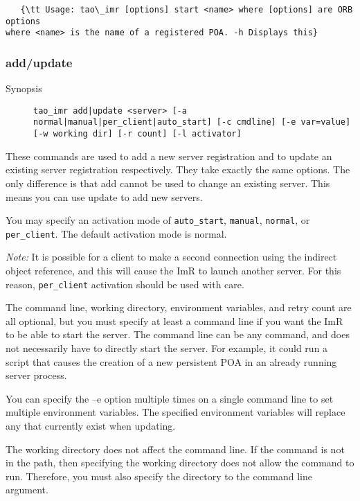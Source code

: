 \begin{itemize}
{\begin{itemize}
{{\begin{verbatim}
   {\tt Usage: tao\_imr [options] start <name> where [options] are ORB options 
where <name> is the name of a registered POA. -h Displays this}
\end{verbatim}

\subsubsection{add/update}

\begin{description}
    \item [Synopsis] {\tt tao\_imr add|update <server> 
                 [-a normal|manual|per_client|auto_start] [-c cmdline] 
                 [-e var=value] [-w working dir] [-r count] [-l activator]}
\end{description}

These commands are used to add a new server registration and to update 
an existing server registration respectively. They take exactly the same 
options. The only difference is that add cannot be used to change an 
existing server. This means you can use update to add new servers.
 
You may specify an activation mode of {\tt auto_start}, {\tt manual}, 
{\tt normal},  or {\tt per_client}. The default activation mode is normal.
 
\emph {Note:} It is possible for a client to make a second connection 
using the indirect object reference, and this will cause the ImR to launch 
another server. For this reason, {\tt per_client} activation should be used 
with care.

The command line, working directory, environment variables, and retry 
count are all optional, but you must specify at least a command line if 
you want the ImR to be able to start the server. The command line can 
be any command, and does not necessarily have to directly start the server. 
For example, it could run a script that causes the creation of a new persistent 
POA in an already running server process.

You can specify the –e option multiple times on a single command line to 
set multiple environment variables. The specified environment variables 
will replace any that currently exist when updating. 

The working directory does not affect the command line. If the command 
is not in the path, then specifying the working directory does not allow the 
command to run. Therefore, you must also specify the directory to the 
command line argument. 

}}
\end{itemize}}
\end{itemize}

